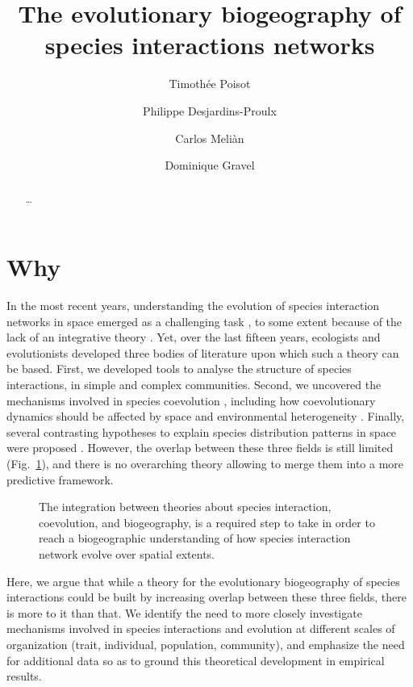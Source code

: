 \documentclass[11pt,oneside]{article}
\title{The evolutionary biogeography of species interactions networks}
\author{Timoth\'ee Poisot \and Philippe Desjardins-Proulx \and Carlos Meli\`an \and Dominique Gravel}
\begin{document}
\maketitle
\begin{abstract}
	\ldots 
\end{abstract}
\onehalfspacing\clearpage


\section{Why}

In the most recent years, understanding the evolution of species interaction
networks in space emerged as a challenging task \parencite{Pillai2011}, to some
extent because of the lack of an integrative theory \parencite{Urban2008}. Yet,
over the last fifteen years, ecologists and evolutionists developed three bodies
of literature upon which such a theory can be based. First, we developed tools
to analyse the structure of species interactions, in simple and complex
communities. Second, we uncovered the mechanisms involved in species coevolution
\parencite{Thompson1994a}, including how coevolutionary dynamics should be
affected by space and environmental heterogeneity \parencite{Thompson2005}.
Finally, several contrasting hypotheses to explain species distribution
patterns in space were proposed \parencite{O'Dwyer2010}. However, the overlap
between these three fields is still limited (Fig.~\ref{f:venn}), and there is
no overarching theory allowing to merge them into a more predictive framework.

\begin{figure}[htbp]
   \centering
   
   \caption{The integration between theories about species interaction,
   coevolution, and biogeography, is a required step to take in order to reach
   a biogeographic understanding of how species interaction network evolve
   over spatial extents.}
   \label{f:venn}
\end{figure}

Here, we argue that while a theory for the evolutionary biogeography of
species interactions could be built by increasing overlap between these three
fields, there is more to it than that. We identify the need to more closely
investigate mechanisms involved in species interactions and evolution at
different scales of organization (trait, individual, population, community),
and emphasize the need for additional data so as to ground this theoretical
development in empirical results.
\end{document}
